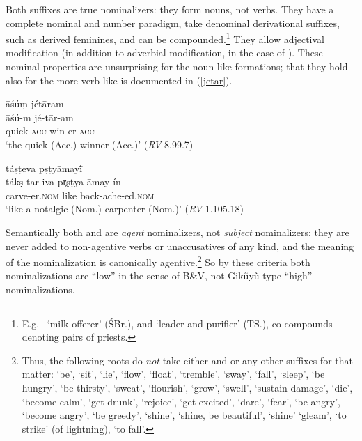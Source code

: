 \documentclass[output=paper,
modfonts
]{LSP/langsci}
\newcommand{\rf}[1]{(\ref{#1})}
\def\urf#1{$^{\textrm{\scriptsize{#1}}}$}
\begin{document}
Both suffixes are true nominalizers: they form nouns, not verbs.  They have a complete nominal
 and number  paradigm, take denominal derivational suffixes, such as derived
feminines, and can be compounded.\footnote{E.g.\  `milk-offerer' (ŚBr.),
  and   `leader and purifier' (TS.), co-compounds
  \citep{kiparsky2010b} denoting  pairs of priests.}  They allow adjectival modification (in
addition to adverbial modification, in the case of \form{′-tar-\urf{V}}).  These nominal
properties are unsurprising for the noun-like \form{-tár-\urf{N}} formations; that they hold
also for the more verb-like \form{′-tar-\urf{V}} is documented in \rf{jetar}.
\begin{exe}
\ex\label{jetar}
 	\ea \glll āśúṃ  jétāram\\
	āśú-m  jé-tār-am\\
	quick-\textsc{acc} win-er-\textsc{acc}\\
	\glt `the quick (Acc.) winner (Acc.)' \hfill (\textit{RV} 8.99.7) 

	\ex \glll táṣṭeva {} pṣṭyāmayī́\\
   	tákṣ-tar iva  {pr̥ṣṭya-āmay-ín}\\
	 carve-er.\textsc{nom} like back-ache-ed.\textsc{nom}\\
	\glt `like a notalgic (Nom.) carpenter (Nom.)' \hfill (\textit{RV} 1.105.18)
	\z
\end{exe}

Semantically both \form{-tár-\urf{N}} and \form{′-tar-\urf{V}} are \textit{agent}
nominalizers, not \textit{subject} nominalizers: they are never added to non-agentive verbs or
unaccusatives of any kind, and the meaning of the nominalization is canonically
agentive.\footnote{Thus, the following roots do \textit{not} take either \form{-tár-\urf{N}}
  and \form{′-tar-\urf{V}} or any other  suffixes for that matter:  `be',
   `sit',  `lie',  `flow',  `float',
   `tremble',  `sway',  `fall', 
  `sleep',  `be hungry',  `be thirsty',  `sweat',
   `flourish',  `grow',  `swell', 
  `sustain damage',  `die',  `become calm',  `get drunk',
   `rejoice',  `get excited',  `dare', 
  `fear',  `be angry',  `become angry',  `be greedy',
   `shine',  `shine, be beautiful',  `shine' 
  `gleam',  `to strike' (of lightning),  `to fall'.} So by these
criteria both nominalizations are ``low'' in the sense of B\&V, not Gikũyũ-type ``high''
nominalizations.
\end{document}
